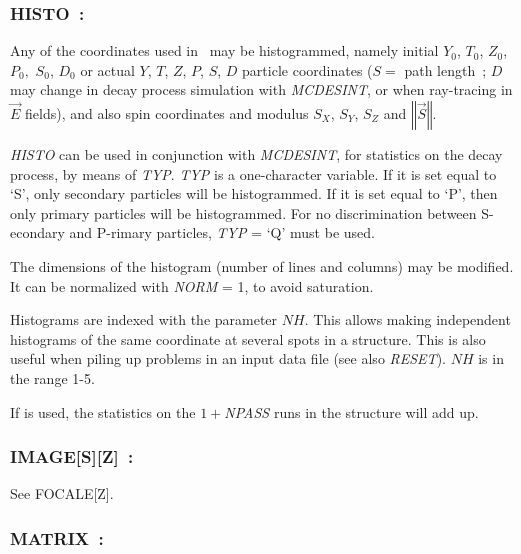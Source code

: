 \newpage

\subsubsection*{HISTO~: \HISTOTitl}\label{HISTO} 
\medskip

Any of the coordinates used in \zgou\ may be histogrammed,
namely initial  $ Y_0$,  $ T_0$,  $ Z_0$,  $ P_0, $ $ S_0 $, $ D_0 $  or actual 
$ Y$, $T$, $Z$, $P$, $S$, $D$ particle coordinates ($ S=$ path length~;  
$ D $ may change  in decay process simulation with \textsl{MCDESINT}, 
or when ray-tracing in $ \vec  E $ fields), and also spin coordinates and
modulus $ S_X$, $ S_Y$,  $ S_Z $ and $ \left\Vert\vec  S \right\Vert   $.  
\bigskip

\noindent\textsl{HISTO}  can be used in conjunction with 
\textsl{MCDESINT}, for statistics 
on the decay process, by means of \textsl{TYP}.  \textsl{TYP} is a one-character 
variable.  If it is set equal to `S', only secondary particles will be 
histogrammed.  If it is set equal to `P', then only  primary particles will be histogrammed.  
For no discrimination  between S-econdary and P-rimary particles,  \textsl{TYP} = `Q'  must be
used.  
\bigskip

\noindent The dimensions of the histogram (number of lines and columns) may be
modified. It can be normalized with \textsl{NORM} = 1, to avoid saturation.  
\bigskip

\noindent Histograms are indexed with the parameter  $NH$.  This allows making
independent histograms of the same coordinate at several spots  
in a structure.  This is also useful when piling up problems in an input data 
file  (see also \textsl{RESET}). $NH$ is in the range 1-5.  
\bigskip

\noindent If \REBELOTE{} is used, the statistics on the $1+$\textsl{NPASS}
runs in the structure will add up. 

\vfill
\subsubsection*{IMAGE[S][Z]~: \IMAGESZTitl}

\noindent See FOCALE[Z]. 
\vfill
\newpage

\subsubsection*{MATRIX~: \MATRIXTitl}\label{MATRIX} 
\medskip

